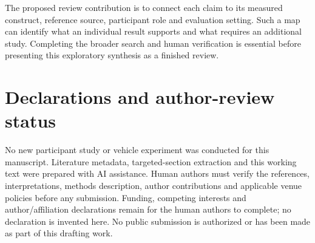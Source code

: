 \documentclass[11pt,a4paper]{article}
\begin{document}
The proposed review contribution is to connect each claim to its
measured construct, reference source, participant role and evaluation
setting. Such a map can identify what an individual result supports and
what requires an additional study. Completing the broader search and
human verification is essential before presenting this exploratory
synthesis as a finished review.

\section*{Declarations and author-review
status}\label{declarations-and-author-review-status}

No new participant study or vehicle experiment was conducted for this
manuscript. Literature metadata, targeted-section extraction and this
working text were prepared with AI assistance. Human authors must verify
the references, interpretations, methods description, author
contributions and applicable venue policies before any submission.
Funding, competing interests and author/affiliation declarations remain
for the human authors to complete; no declaration is invented here. No
public submission is authorized or has been made as part of this
drafting work.
\clearpage
{}
{}
\end{document}
